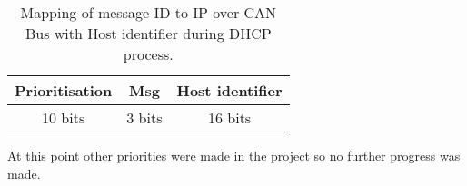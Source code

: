 \begin{table}[h]
\centering
    \caption{Mapping of message ID to IP over CAN Bus with Host identifier
    during DHCP process.}
    \begin{tabular}{|c|c|c|} \hline
    \label{table:mapping_message_id_to_ip_host_identifier}
    Prioritisation & Msg & Host identifier \\ \hline
            10 bits & 3 bits & 16 bits\\ \hline
    \end{tabular}
\end{table}

At this point other priorities were made in the project so no further progress
was made.
